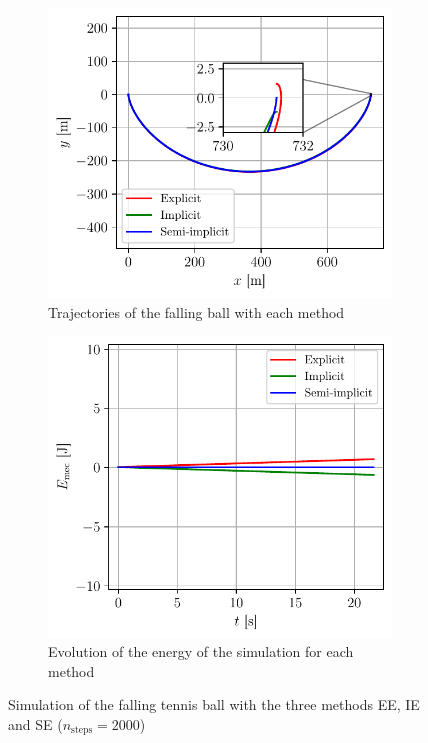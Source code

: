 \begin{figure}[h]
    \centering
    \begin{subfigure}{0.5\linewidth}
        \centering
        \includegraphics[width=\linewidth]{figures/rotate_grav_trajectories.pdf}
        \caption{Trajectories of the falling ball with each method}
        \label{fig:rotate_grav:traj}
    \end{subfigure}
    \hspace*{0.2cm}
    \begin{subfigure}{0.47\linewidth}
        \centering
        \includegraphics[width=\linewidth]{figures/rotate_grav_energy.pdf}
        \caption{Evolution of the energy of the simulation for each method}
        \label{fig:rotate_grav:nrj}
    \end{subfigure}
    \caption{Simulation of the falling tennis ball with the three methods EE, IE and SE \mbox{($n_\textrm{steps}=2000$)}}
\end{figure}


